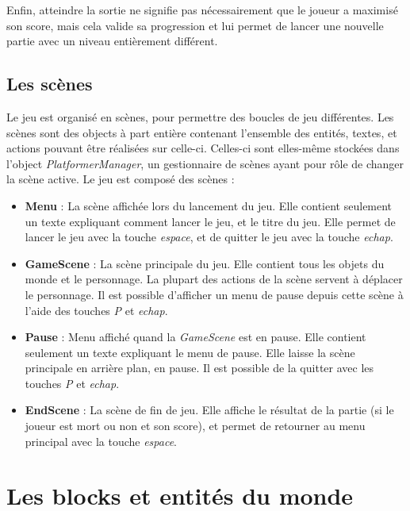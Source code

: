 \documentclass[10pt]{report}
\begin{document}
Enfin, atteindre la sortie ne signifie pas nécessairement que le joueur a maximisé son score, mais cela valide
sa progression et lui permet de lancer une nouvelle partie avec un niveau entièrement différent.

\subsection{Les scènes}

Le jeu est organisé en scènes, pour permettre des boucles de jeu différentes.
Les scènes sont des objects à part entière contenant l'ensemble des entités, textes, et actions pouvant être réalisées sur celle-ci.
Celles-ci sont elles-même stockées dans l'object \emph{PlatformerManager}, un gestionnaire de scènes ayant pour rôle de changer la scène active.
Le jeu est composé des scènes :\\
\begin{itemize}
  \item \textbf{Menu} : La scène affichée lors du lancement du jeu.
  Elle contient seulement un texte expliquant comment lancer le jeu, et le titre du jeu.
  Elle permet de lancer le jeu avec la touche \emph{espace}, et de quitter le jeu avec la touche \emph{echap}.
  \item \textbf{GameScene} : La scène principale du jeu.
  Elle contient tous les objets du monde et le personnage.
  La plupart des actions de la scène servent à déplacer le personnage.
  Il est possible d'afficher un menu de pause depuis cette scène à l'aide des touches \emph{P} et \emph{echap}.
  \item \textbf{Pause} : Menu affiché quand la \emph{GameScene} est en pause.
  Elle contient seulement un texte expliquant le menu de pause.
  Elle laisse la scène principale en arrière plan, en pause.
  Il est possible de la quitter avec les touches \emph{P} et \emph{echap}.
  \item \textbf{EndScene} : La scène de fin de jeu.
  Elle affiche le résultat de la partie (si le joueur est mort ou non et son score), et permet de retourner au menu principal avec la touche \emph{espace}.
\end{itemize}

\section{Les blocks et entités du monde}
\end{document}
